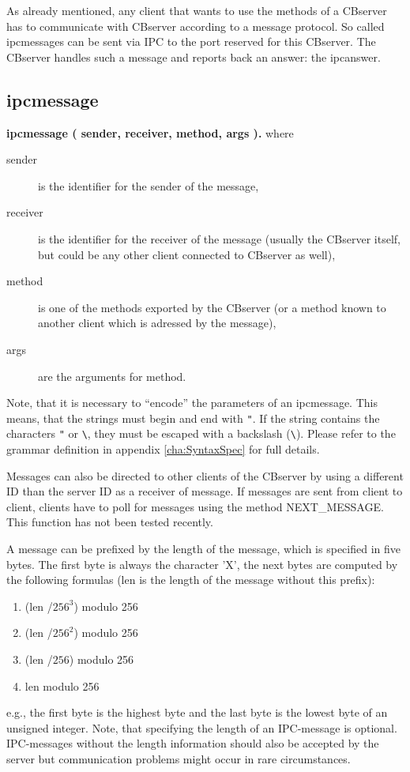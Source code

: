 As already mentioned, any client that wants to use the methods of a
CBserver has to communicate with CBserver according to a message protocol.
So called ipcmessages can be sent via IPC to the port reserved for this
CBserver. The CBserver handles such a message and reports back an answer:
the ipcanswer.

\subsection{ipcmessage}

{\bf ipcmessage ( sender, receiver, method, args ).} where

\begin{description}
\item[sender] is the identifier for the sender of the message,
\item[receiver] is the identifier for the receiver of the message
  (usually the CBserver itself, but could be any other client connected to CBserver
  as well),
\item[method] is one of the methods exported by the CBserver (or a method known
  to another client which is adressed by the message),
\item[args] are the arguments for method.
\end{description}


Note, that it is necessary to ``encode'' the parameters of an ipcmessage.
This means, that the strings must begin and end with \verb+"+. If the string
contains the characters \verb+"+ or \verb+\+, they must be escaped with a backslash (\verb+\+).
Please refer to the grammar definition in appendix \ref{cha:SyntaxSpec} for full details.

Messages can also be directed to other clients of the
CBserver by using a different ID than the server ID as a receiver of message.
If messages are sent from client to client, clients have to poll for messages
using the method NEXT\_MESSAGE. This function has not been tested recently.

A message can be prefixed by the length of the message, which is specified
in five bytes. The first byte is always the character 'X', the next bytes
are computed by the following formulas (len is the length of the message without
this prefix):
\begin{enumerate}
\item (len /$256^3$) modulo 256
\item (len /$256^2$) modulo 256
\item (len /$256$) modulo 256
\item len modulo 256
\end{enumerate}
e.g., the first byte is the highest byte and
the last byte is the lowest byte of an unsigned integer. Note, that
specifying the length of an IPC-message is optional. IPC-messages without
the length information should also be accepted by the server but communication problems
might occur in rare circumstances.

